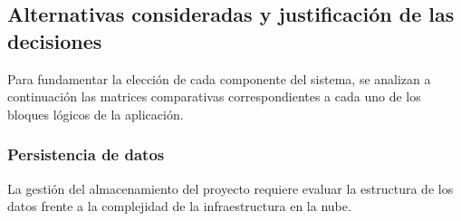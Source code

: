 \begin{table}[H]
\centering
\small
\renewcommand{\arraystretch}{1.5}
\setlength{\tabcolsep}{15pt}
\caption{Resumen del \textit{stack} tecnológico de Quizzie.}
\label{tab:resumen_stack}
\end{table}

\subsection{Alternativas consideradas y justificación de las decisiones}\label{subsec:alternativas_y_justificacion}

Para fundamentar la elección de cada componente del sistema, se analizan a continuación las matrices comparativas correspondientes a cada uno de los bloques lógicos de la aplicación.

\subsubsection{Persistencia de datos}
La gestión del almacenamiento del proyecto requiere evaluar la estructura de los datos frente a la complejidad de la infraestructura en la nube.

